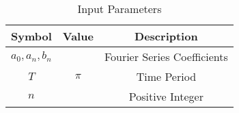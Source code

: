 \begin{table}[!h]
    \centering
    \begin{tabular}{|c|c|c|}
    \hline
       \textbf{Symbol}  &  \textbf{Value} & \textbf{Description}\\
    \hline
       $a_0, a_n, b_n$  & & Fourier Series Coefficients\\
    \hline
        $T$ & $\pi$ & Time Period\\
    \hline
        $n$ & &Positive Integer\\
    \hline
    \end{tabular}
    \caption{Input Parameters}
    \label{tab:1_gate.22.nm.24}
\end{table}

